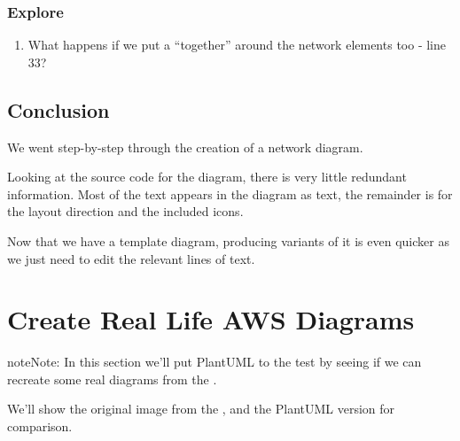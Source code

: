 \documentclass[letterpaper,10pt,english]{sphinxmanual}
\begin{document}
\subsubsection{Explore}
\label{\detokenize{NetworkUsersMachines/NetworkUsersMachines:id14}}\begin{enumerate}
%
\item {} 
What happens if we put a “together” around the network elements too - line 33?

\end{enumerate}


\subsection{Conclusion}
\label{\detokenize{NetworkUsersMachines/NetworkUsersMachines:conclusion}}
We went step-by-step through the creation of a network diagram.

Looking at the source code for the diagram, there is very little redundant information. Most of the text appears in the diagram as text, the remainder is for the layout direction and the included icons.

Now that we have a template diagram, producing variants of it is even quicker as we just need to edit the relevant lines of text.


\section{Create Real Life AWS Diagrams}
\label{\detokenize{aws/aws:create-real-life-aws-diagrams}}\label{\detokenize{aws/aws::doc}}
\begin{sphinxadmonition}{note}{Note:}
In this section we’ll put PlantUML to the test by seeing if we can recreate some real diagrams from the .

We’ll show the original image from the , and the PlantUML version for comparison.

\end{sphinxadmonition}
\end{document}
